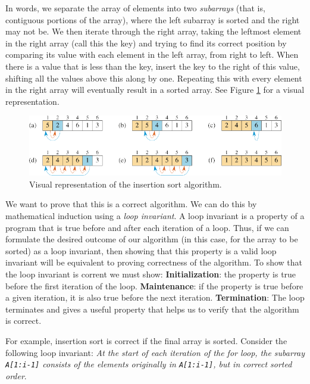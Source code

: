 \documentclass[12pt]{article}
\begin{document}
In words, we separate the array of elements into two \textit{subarrays} (that is, contiguous portions of the array), where the
left subarray is sorted and the right may not be. We then iterate through the right array, taking the leftmost element in
the right array (call this the key) and trying to find its correct position by comparing its value with each element in the left
array, from right to left. When there is a value that is less than the key, insert the key to the right of
this value, shifting all the values above this along by one. Repeating this with every element in the right array
will eventually result in a sorted array. See Figure \ref{Figure: insertion sort} for a visual representation.

\begin{figure}[ht]\centering
    \includegraphics[angle=0]{Figures/insertion-sort.pdf}
    \caption{Visual representation of the insertion sort algorithm.}
    \label{Figure: insertion sort}
\end{figure}

We want to prove that this is a correct algorithm. We can do this by mathematical induction using a \textit{loop invariant}.
A loop invariant is a property of a program that is true before and after each iteration of a loop. Thus, if we can formulate
the desired outcome of our algorithm (in this case, for the array to be sorted) as a loop invariant, then showing that this property
is a valid loop invariant will be equivalent to proving correctness of the algorithm. To show that the loop invariant is corrent we must
show:
\newline \textbf{Initialization}: the property is true before the first iteration of the loop.
\newline \textbf{Maintenance}: if the property is true before a given iteration, it is also true before the next iteration.
\newline \textbf{Termination}: The loop terminates and gives a useful property that helps us to verify that the algorithm is correct.

For example, insertion sort is correct if the final array is sorted. Consider the following loop invariant:
\newline \textit{At the start of each iteration of the for loop, the subarray \texttt{A[1:i-1]} consists of the elements originally in \texttt{A[1:i-1]},
but in correct sorted order}.
\end{document}
